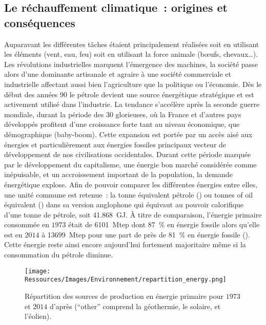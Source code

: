 \subsection{Le réchauffement climatique~: origines et conséquences} %
\label{sub:le_rechauffement_climatique_origines_et_consequences}
Auparavant les différentes tâches étaient principalement réalisées soit en utilisant les
éléments (vent, eau, feu) soit en utilisant la force animale (bœufs, chevaux\dots). Les
révolutions industrielles marquent l’émergence des machines, la société passe alors d’une
dominante artisanale et agraire à une société commerciale et industrielle affectant aussi
bien l’agriculture que la politique ou l’économie. Dès le début des années $90$ le
pétrole devient une source énergétique stratégique et est
activement utilisé dans l’industrie. La tendance s’accélère après la seconde guerre
mondiale, durant la période des $30$ glorieuses, où la France et d’autres pays développés
profitent d’une croissance forte tant au niveau économique, que démographique (baby-boom).
Cette expansion est portée par un accès aisé aux énergies et particulièrement aux énergies
fossiles principaux vecteur de développement de nos civilisations occidentales. Durant
cette période marquée par le développement du capitalisme, une énergie bon marché
considérée comme inépuisable, et un accroissement important de la population, la demande
énergétique explose. Afin de pouvoir comparer les différentes énergies entre elles, une
unité commune est retenue~: la tonne équivalent pétrole () ou tonnes of oil
équivalent () dans sa version anglophone qui équivaut au pouvoir calorifique
d’une tonne de pétrole, soit \SI{41.868}{\giga\joule}.
À titre de comparaison, l’énergie primaire consommée en $1973$ était de
\SI{6101}{\mega tep} dont \SI{87}{\percent} en énergie fossile alors qu’elle est en $2014$
à \SI{13699}{\mega tep} pour une part de près de \SI{81}{\percent} en énergie fossile
(). Cette énergie reste ainsi encore aujourd’hui fortement
majoritaire même si la consommation du pétrole diminue.

\begin{figure}
    \centering
    \texttt{[image: Ressources/Images/Environnement/repartition\_energy.png]}
    \caption[Répartition des sources de production en énergie primaire pour $1973$ et $2014$]
            {Répartition des sources de production en énergie primaire pour
             $1973$ et $2014$ d’après \textcite{IEA2016} (\enquote{other} comprend
             la géothermie, le solaire, et l’éolien).}
    \label{fig:energy_fraction}
\end{figure}


